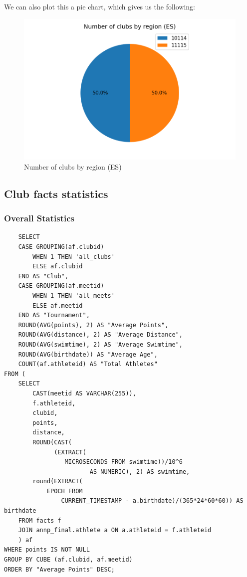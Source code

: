 \documentclass[a4paper, 11pt]{article}
\begin{document}
We can also plot this a pie chart, which gives us the following:

\begin{figure}[H]
    \centering
    \includegraphics[width=.6\textwidth]{img/clubsbyregion-es-pie}
    \caption{Number of clubs by region (ES)}
    \label{fig:clubs-by-region-es-pie}
\end{figure}

\subsection{Club facts statistics}

\subsubsection{Overall Statistics}



\begin{verbatim}
    SELECT
    CASE GROUPING(af.clubid)
        WHEN 1 THEN 'all_clubs'
        ELSE af.clubid
    END AS "Club",
    CASE GROUPING(af.meetid)
        WHEN 1 THEN 'all_meets'
        ELSE af.meetid
    END AS "Tournament",
    ROUND(AVG(points), 2) AS "Average Points",
    ROUND(AVG(distance), 2) AS "Average Distance",
    ROUND(AVG(swimtime), 2) AS "Average Swimtime",
    ROUND(AVG(birthdate)) AS "Average Age",
    COUNT(af.athleteid) AS "Total Athletes"
FROM (
    SELECT
        CAST(meetid AS VARCHAR(255)),
        f.athleteid,
        clubid,
        points,
        distance,
        ROUND(CAST(
              (EXTRACT(
                 MICROSECONDS FROM swimtime))/10^6 
                        AS NUMERIC), 2) AS swimtime,
        round(EXTRACT(
            EPOCH FROM 
                CURRENT_TIMESTAMP - a.birthdate)/(365*24*60*60)) AS birthdate
    FROM facts f
    JOIN annp_final.athlete a ON a.athleteid = f.athleteid
    ) af
WHERE points IS NOT NULL
GROUP BY CUBE (af.clubid, af.meetid)
ORDER BY "Average Points" DESC;
\end{verbatim}
\end{document}
